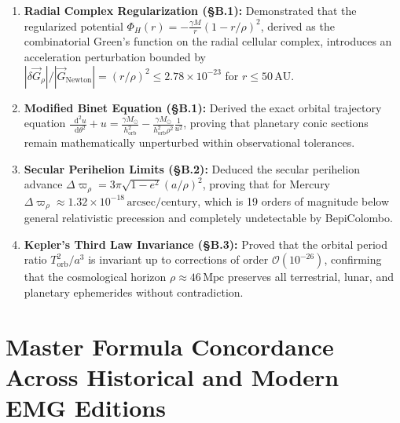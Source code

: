 \documentclass[
    12pt,
    a4paper,
    headings=normal,
    twoside=false,
    open=any,
    parskip=half
]{scrbook}
\newcommand{\diff}{\mathop{}\!\mathrm{d}}
\begin{document}
\begin{tcolorbox}[colback=maincolor!3!white, colframe=maincolor!80!black, title={\textbf{Grand Synthesis of Appendix B}}]
\begin{enumerate}[leftmargin=1.5em, itemsep=5pt]
    \item \textbf{Radial Complex Regularization (§B.1):} Demonstrated that the regularized potential $\Phi_H(r) = -\frac{\gamma M}{r}(1 - r/\rho)^2$, derived as the combinatorial Green's function on the radial cellular complex, introduces an acceleration perturbation bounded by $|\delta\vec{G}_\rho| / |\vec{G}_{\text{Newton}}| = (r/\rho)^2 \le 2.78 \times 10^{-23}$ for $r \le 50\,\text{AU}$.
    \item \textbf{Modified Binet Equation (§B.1):} Derived the exact orbital trajectory equation $\frac{\diff^2 u}{\diff\theta^2} + u = \frac{\gamma M_\odot}{h_{\text{orb}}^2} - \frac{\gamma M_\odot}{h_{\text{orb}}^2 \rho^2} \frac{1}{u^2}$, proving that planetary conic sections remain mathematically unperturbed within observational tolerances.
    \item \textbf{Secular Perihelion Limits (§B.2):} Deduced the secular perihelion advance $\Delta\varpi_\rho = 3\pi \sqrt{1 - e^2}(a/\rho)^2$, proving that for Mercury $\Delta\varpi_\rho \approx 1.32 \times 10^{-18}\,\text{arcsec/century}$, which is 19 orders of magnitude below general relativistic precession and completely undetectable by BepiColombo.
    \item \textbf{Kepler's Third Law Invariance (§B.3):} Proved that the orbital period ratio $T_{\text{orb}}^2 / a^3$ is invariant up to corrections of order $\mathcal{O}(10^{-26})$, confirming that the cosmological horizon $\rho \approx 46\,\text{Mpc}$ preserves all terrestrial, lunar, and planetary ephemerides without contradiction.
\end{enumerate}
\end{tcolorbox}

\chapter{Master Formula Concordance Across Historical and Modern EMG Editions}
\label{app:master_formula_concordance}
\end{document}
